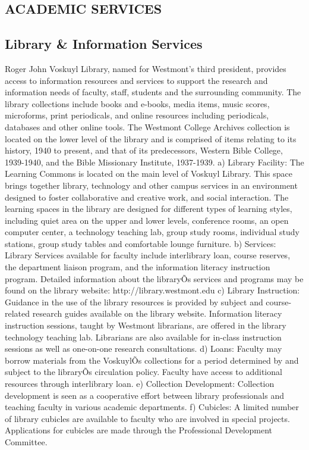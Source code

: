 \documentclass[letterpaper, 11pt]{article}
\begin{document}
	\subsection{ACADEMIC SERVICES}
	\subsection{Library \& Information Services}
		Roger John Voskuyl Library, named for Westmont's third president, provides access to information resources and services to support the research and information needs of faculty, staff, students and the surrounding community.  The library collections include books and e-books, media items, music scores, microforms, print periodicals, and online resources including periodicals, databases and other online tools.  The Westmont College Archives collection is located on the lower level of the library and is comprised of items relating to its history, 1940 to present, and that of its predecessors, Western Bible College, 1939-1940, and the Bible Missionary Institute, 1937-1939.
		a) Library Facility:  The Learning Commons is located on the main level of Voskuyl Library.  This space brings together library, technology and other campus services in an environment designed to foster collaborative and creative work, and social interaction.  The learning spaces in the library are designed for different types of learning styles, including quiet area on the upper and lower levels, conference rooms, an open computer center, a technology teaching lab, group study rooms, individual study stations, group study tables and comfortable lounge furniture.
		b) Services:  Library Services available for faculty include interlibrary loan, course reserves, the department liaison program, and the information literacy instruction program.  Detailed information about the libraryÕs services and programs may be found on the library website: http://library.westmont.edu
		c) Library Instruction:  Guidance in the use of the library resources is provided by subject and course-related research guides available on the library website.  Information literacy instruction sessions, taught by Westmont librarians, are offered in the library technology teaching lab.  Librarians are also available for in-class instruction sessions as well as one-on-one research consultations.
		d) Loans:  Faculty may borrow materials from the VoskuylÕs collections for a period determined by and subject to the libraryÕs circulation policy.  Faculty have access to additional resources through interlibrary loan.
		e) Collection Development:  Collection development is seen as a cooperative effort between library professionals and teaching faculty in various academic departments.
		f) Cubicles:  A limited number of library cubicles are available to faculty who are involved in special projects.  Applications for cubicles are made through the Professional Development Committee.
\end{document}
